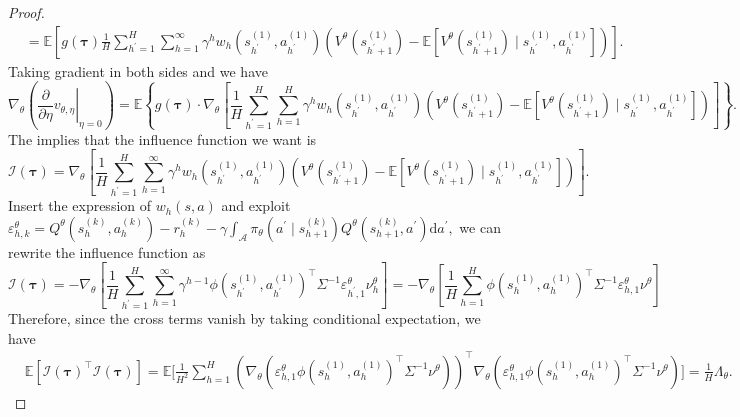 \documentclass{article}
\numberwithin{equation}{section}
\begin{document}
\begin{proof}
\begin{align*}
    &= \mathbb{E} \left[g\left(\boldsymbol{\tau}\right)\frac{1}{H}\sum_{h^\prime=1}^H\sum_{h=1}^\infty\gamma^h w_{h}\left(s_{h^\prime}^{(1)}, a_{h^\prime}^{(1)}\right)\left( V^{\theta}\left(s_{h^\prime+1}^{(1)}\right)-\mathbb{E}\left[V^{\theta}\left(s_{h^\prime+1}^{(1)}\right)\mid s_{h^\prime}^{(1)},a_{h^\prime}^{(1)}\right]\right)\right].
\end{align*}
Taking gradient in both sides and we have
\begin{equation*}
    \nabla_{\theta}\left(\left.\frac{\partial}{\partial\eta} v_{\theta,\eta}\right|_{\eta = 0}\right) = \mathbb{E}\left\{g\left(\boldsymbol{\tau}\right) \cdot \nabla_{\theta} \left[\frac{1}{H}\sum_{h^\prime=1}^H\sum_{h=1}^H \gamma^h w_{h}\left(s_{h^\prime}^{(1)}, a_{h^\prime}^{(1)}\right) \left( V^{\theta}\left(s_{h^\prime+1}^{(1)}\right)-\mathbb{E}\left[V^{\theta}\left(s_{h^\prime+1}^{(1)}\right) \mid s_{h^\prime}^{(1)}, a_{h^\prime}^{(1)}\right]\right)\right]\right\}.
\end{equation*}
The implies that the influence function we want is
\begin{equation*}
    \mathcal{I}(\boldsymbol{\tau}) = \nabla_{\theta} \left[\frac{1}{H}\sum_{h^\prime=1}^H\sum_{h=1}^\infty \gamma^h w_{h}\left(s_{h^\prime}^{(1)}, a_{h^\prime}^{(1)}\right) \left( V^{\theta}\left(s_{h^\prime+1}^{(1)}\right)-\mathbb{E}\left[V^{\theta}\left(s_{h^\prime+1}^{(1)}\right) \mid s_{h^\prime}^{(1)}, a_{h^\prime}^{(1)}\right]\right)\right].
\end{equation*}
Insert the expression of $w_h(s,a)$ and exploit $\varepsilon_{h,k}^{\theta}=Q^{\theta}(s_h^{(k)}, a_h^{(k)})-r_h^{(k)}-\gamma\int_{\mathcal{A}} \pi_{\theta}\left(a^{\prime} \mid s_{h+1}^{(k)}\right) Q^{\theta}\left(s_{h+1}^{(k)}, a^{\prime}\right) \mathrm{d} a^{\prime},$ we can rewrite the influence function as
\begin{equation*}
    \mathcal{I}(\boldsymbol{\tau})=-\nabla_\theta\left[\frac{1}{H}\sum_{h^\prime=1}^H\sum_{h=1}^\infty\gamma^{h-1}\phi\left(s_{h^\prime}^{(1)},a_{h^\prime}^{(1)}\right)^\top\Sigma^{-1}\varepsilon_{h^\prime,1}^\theta\nu_h^\theta\right]=-\nabla_\theta\left[\frac{1}{H}\sum_{h=1}^H\phi\left(s_{h}^{(1)},a_{h}^{(1)}\right)^\top\Sigma^{-1}\varepsilon_{h,1}^\theta\nu^\theta\right]
\end{equation*}
Therefore, since the cross terms vanish by taking conditional expectation, we have
\begin{align*}
    &\mathbb{E}\left[\mathcal{I}(\boldsymbol{\tau})^{\top} \mathcal{I}(\boldsymbol{\tau})\right]=\mathbb{E}\Bigg[\frac{1}{H^2}\sum_{h=1}^H\left(\nabla_\theta\left(\varepsilon^\theta_{h,1}\phi\left(s_h^{(1)},a_h^{(1)}\right)^\top\Sigma^{-1}\nu^\theta\right)\right)^\top\nabla_\theta\left(\varepsilon^\theta_{h,1}\phi\left(s_h^{(1)},a_h^{(1)}\right)^\top\Sigma^{-1}\nu^\theta \right)\Bigg]=\frac{1}{H}\Lambda_{\theta}.

\end{align*}
\end{proof}
\end{document}
